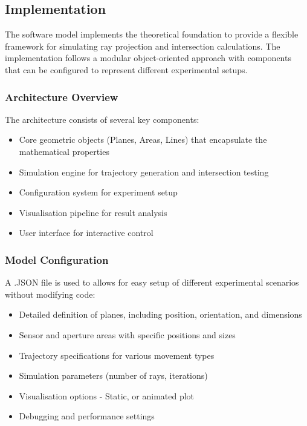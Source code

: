 \subsection{Implementation}

The software model implements the theoretical foundation to provide a flexible framework for simulating ray projection and intersection calculations. The implementation follows a modular object-oriented approach with  components that can be configured to represent different experimental setups.

\subsubsection{Architecture Overview}

The architecture consists of several key components:
\begin{itemize}
\item Core geometric objects (Planes, Areas, Lines) that encapsulate the mathematical properties
\item Simulation engine for trajectory generation and intersection testing
\item Configuration system for experiment setup
\item Visualisation  pipeline for result analysis
\item User interface for interactive control
\end{itemize}

\subsubsection{Model Configuration}

A .JSON file is used to  allows for easy setup of different experimental scenarios without modifying code:

\begin{itemize}
\item Detailed definition of planes, including position, orientation, and dimensions
\item Sensor and aperture areas with specific positions and sizes
\item Trajectory specifications for various movement types
\item Simulation parameters (number of rays, iterations)
\item Visualisation options - Static, or animated plot 
\item Debugging and performance settings
\end{itemize}

